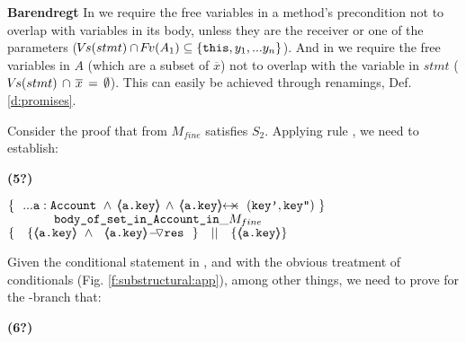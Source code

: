  \vspace{.1cm}

\noindent
\textbf{Barendregt} In  {} we  require   the free variables  in a method's precondition  not to overlap with variables in its body, unless they are the receiver or one of the parameters (${{{\hspace{-1pt}V\hspace{-1pt}}s(stmt) \cap {\hspace{-1pt}F\hspace{-1pt}}v(A_1) \subseteq   \{ \mbox{\normalfont{\texttt{this}}}, y_1, ... y_n \} }}$).  And in {} we require   the free variables in $A$ (which are a subset of  $\overline x$) not to overlap with the variable  in $stmt$ ($ {{ {\hspace{-1pt}V\hspace{-1pt}}s(stmt)\,  \cap\, \overline x\, =\, \emptyset}}$).
This can easily be achieved through renamings, \cf Def. \ref{d:promises}.

\newcommand{\sdsp}{\strut \ \ \ \ \ }

\begin{example} Consider the proof that  from $M_{fine}$ satisfies $S_2$. Applying rule {}, we need to establish:\\
\label{e:public}
{\small{ \vspace{.05cm}
  \begin{minipage}{.05\textwidth}
  \textbf{(5?)}\ \ 
\end{minipage}
\hfill
\begin{minipage}{.95\textwidth}
\begin{flushleft}
$\{ \  \   ... \prg{a}:\prg{Account}\ \wedge\,  {\inside{\prg{a.key}}} \, \wedge \, \protectedFrom {\prg{a.key}} {(\prg{key'},\prg{key''})} \  \} \ $\\
$\ \ \ \ \ \ \ \ \ \ \  \prg{body\_of\_set\_in\_Account\_in}\_ M_{fine}\   $\\
$  \{\  \ \   \{ {\inside{\prg{a.key}}}\ \wedge\ {\PushASLong {\prg{res}\ } {\ \inside{\prg{a.key}}}} \   \} \ \ \  || \ \ \ 
	   \{ {\inside{\prg{a.key}}} \}  $ 
\end{flushleft}
\end{minipage}
}}
\vspace{.03cm}
\noindent
Given the conditional statement in , and with the obvious treatment of conditionals (\cf Fig. \ref{f:substructural:app}), among other things, we  need to prove for the -branch that:\\
\vspace{.01cm}
{\small{  \begin{minipage}{.05\textwidth}
  \textbf{(6?)}\ \ 
\end{minipage}
\hfill
\begin{minipage}{.95\textwidth}

\end{minipage}}}
\end{example}
